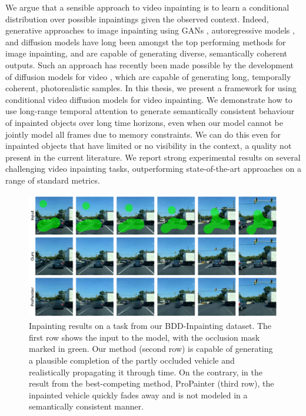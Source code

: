  
We argue that a sensible approach to video inpainting is to learn a conditional distribution over possible inpaintings given the observed context. Indeed, generative approaches to image inpainting using GANs \citep{imin3, imin4, imin5}, autoregressive models \citep{imin1}, and diffusion models \citep{palette, repaint} have long been amongst the top performing methods for image inpainting, and are capable of generating diverse, semantically coherent outputs. Such an approach has recently been made possible by the development of diffusion models for video \citep{didrik, fdm, vdm, yang2022diffusion, voleti2022MCVD}, which are capable of generating long, temporally coherent, photorealistic samples. In this thesis, we present a framework for using conditional video diffusion models for video inpainting. We demonstrate how to use long-range temporal attention to generate semantically consistent behaviour of inpainted objects over long time horizons, even when our model cannot be jointly model all frames due to memory constraints. We can do this even for inpainted objects that have limited or no visibility in the context, a quality not present in the current literature. We report strong experimental results on several challenging video inpainting tasks, outperforming state-of-the-art approaches on a range of standard metrics.

\begin{figure}[h!]
    \centering
    \includegraphics[width=\textwidth]{figures/bddv2.pdf}
    \caption[Inpainting results on a task from our BDD-Inpainting dataset.]{Inpainting results on a task from our BDD-Inpainting dataset. The first row shows the input to the model, with the occlusion mask marked in green. Our method (second row) is capable of generating a plausible completion of the partly occluded vehicle and realistically propagating it through time. On the contrary, in the result from the best-competing method, ProPainter \citep{propainter} (third row), the inpainted vehicle quickly fades away and is not modeled in a semantically consistent manner.}
    \label{fig:fig1}
\end{figure}

